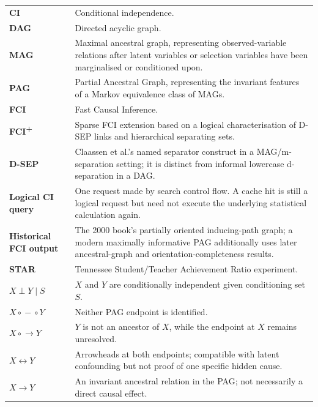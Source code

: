 \documentclass[11pt,a4paper,oneside]{report}
\newcommand{\FCIplus}{FCI\textsuperscript{+}}
\begin{document}
\begin{longtable}{>{\bfseries}p{}p{}}
CI & Conditional independence. \\
DAG & Directed acyclic graph. \\
MAG & Maximal ancestral graph, representing observed-variable relations after
      latent variables or selection variables have been marginalised or
      conditioned upon. \\
PAG & Partial Ancestral Graph, representing the invariant features of a Markov
      equivalence class of MAGs. \\
FCI & Fast Causal Inference. \\
\FCIplus{} & Sparse FCI extension based on a logical characterisation of D-SEP
             links and hierarchical separating sets. \\
D-SEP & Claassen et al.'s named separator construct in a MAG/m-separation
        setting; it is distinct from informal lowercase d-separation in a DAG. \\
Logical CI query & One request made by search control flow. A cache hit is
                   still a logical request but need not execute the underlying
                   statistical calculation again. \\
Historical FCI output & The 2000 book's partially oriented inducing-path graph;
                        a modern maximally informative PAG additionally uses
                        later ancestral-graph and orientation-completeness
                        results. \\
STAR & Tennessee Student/Teacher Achievement Ratio experiment. \\
\(X \perp Y \mid S\) & \(X\) and \(Y\) are conditionally independent given
                       conditioning set \(S\). \\
\(X\circ\!\!-\!\!\circ Y\) & Neither PAG endpoint is identified. \\
\(X\circ\!\!\to Y\) & \(Y\) is not an ancestor of \(X\), while the endpoint at
                      \(X\) remains unresolved. \\
\(X\leftrightarrow Y\) & Arrowheads at both endpoints; compatible with latent
                         confounding but not proof of one specific hidden cause. \\
\(X\to Y\) & An invariant ancestral relation in the PAG; not necessarily a
             direct causal effect. \\
\end{longtable}
\end{document}
